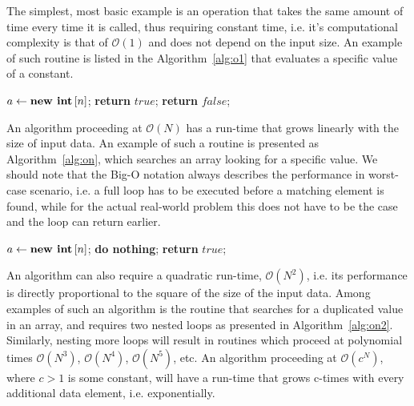The simplest, most basic example is an operation that takes the same amount of time every time it is called, thus requiring constant time, i.e. it's computational complexity is that of $\mathcal{O}\left(1\right)$ and does not depend on the input size.
An example of such routine is listed in the Algorithm~\ref{alg:o1} that evaluates a specific value of a constant.

\begin{algorithm}[h!]
\centering
\begin{algorithmic}[1]
\State $a \gets \text{\textbf{new int}}\left[n\right]$;
%
%
%
\State \textbf{return} $true$;
%
\Else 
%
\State \textbf{return} $false$;
%
\EndIf
%
\EndFor
\end{algorithmic}
\caption{
{ \footnotesize 
{\bf Search for a value.} 
}%
}
\label{alg:on}
\end{algorithm}

An algorithm proceeding at $\mathcal{O}\left(N\right)$ has a run-time that grows linearly with the size of input data.
An example of such a routine is presented as Algorithm~\ref{alg:on}, which searches an array looking for a specific value.
We should note that the Big-O notation always describes the performance in worst-case scenario, i.e. a full loop has to be executed before a matching element is found, while for the actual real-world problem this does not have to be the case and the loop can return earlier.

\begin{algorithm}[h!]
\centering
\begin{algorithmic}[1]
\State $a \gets \text{\textbf{new int}}\left[n\right]$;
%
%
%
%
\State \textbf{do nothing};
%
\Else 
%
%
\State \textbf{return} $true$;
%
\EndIf
%
\EndIf {}
%
\EndFor {}
%
\EndFor {}
\end{algorithmic}
\caption{
{ \footnotesize 
{\bf Search for the first duplicated value.} 
}%
}
\label{alg:on2}
\end{algorithm}

An algorithm can also require a quadratic run-time, $\mathcal{O}\left(N^2\right)$, i.e. its performance is directly proportional to the square of the size of the input data.
Among examples of such an algorithm is the routine that searches for a duplicated value in an array, and requires two nested loops as presented in Algorithm~\ref{alg:on2}.
Similarly, nesting more loops will result in routines which proceed at polynomial times $\mathcal{O}\left(N^3\right)$, $\mathcal{O}\left(N^4\right)$, $\mathcal{O}\left(N^5\right)$, etc.
An algorithm proceeding at $\mathcal{O}\left(c^N\right)$, where $c>1$ is some constant, will have a run-time that grows c-times with every additional data element, i.e. exponentially. 

